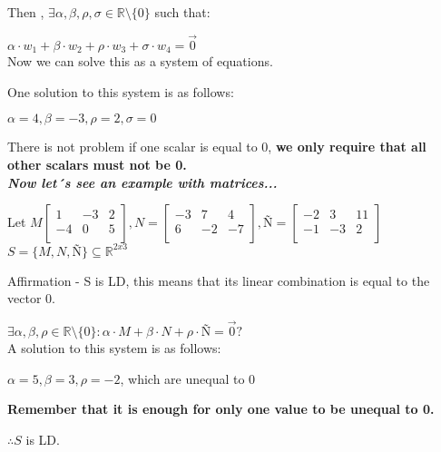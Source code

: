 \documentclass{article}
\begin{document}
Then , \(\exists \alpha, \beta, \rho, \sigma \in \mathbb{R}\text{\textbackslash\{0\}}\) such that:

\(\alpha \cdot w_1 + \beta \cdot w_2 + \rho \cdot w_3 + \sigma \cdot w_4 = \vec{0}\)
\\

Now we can solve this as a system of equations.

One solution to this system is as follows: 

\(\alpha = 4, \beta = -3, \rho = 2, \sigma = 0\)

There is not problem if one scalar is equal to 0, \textbf{we only require that all other scalars must not be 0.}
\\

\textbf{\textit{Now let´s see an example with matrices...}}

Let \(M \begin{bmatrix}
    1&-3&2\\
    -4&0&5\\
\end{bmatrix}, N = \begin{bmatrix}
    -3&7&4\\
    6&-2&-7\\
\end{bmatrix}, Ñ = \begin{bmatrix}
    -2&3&11\\
    -1&-3&2\\
\end{bmatrix}\)
\\

\(S = \{M,N,Ñ\} \subseteq \mathbb{R}^{2x3}\)

Affirmation - S is LD, this means that its linear combination is equal to the vector 0.

\(\exists \alpha, \beta, \rho \in \mathbb{R} \text{\textbackslash}\{0\} : \alpha \cdot M + \beta \cdot N + \rho \cdot Ñ = \vec{0}?\)
\\

A solution to this system is as follows:

\(\alpha = 5, \beta = 3, \rho =-2\), which are unequal to 0

\textbf{Remember that it is enough for only one value to be unequal to 0.}

\(\therefore S\) is LD.
\end{document}

